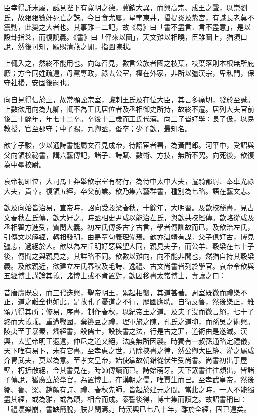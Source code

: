 \begin{pinyinscope}
臣幸得託末屬，誠見陛下有寬明之德，冀銷大異，而興高宗、成王之聲，以崇劉氏，故豤豤數奸死亡之誅。今日食尤屢，星孛東井，攝提炎及紫宮，有識長老莫不震動，此變之大者也。其事難一二記，故《易》曰「書不盡言，言不盡意」，是以設卦指爻，而復說義。《書》曰「伻來以圖」，天文難以相曉，臣雖圖上，猶須口說，然後可知，願賜清燕之閒，指圖陳狀。

上輒入之，然終不能用也。向每召見，數言公族者國之枝葉，枝葉落則本根無所庇廕；方今同姓疏遠，母黨專政，祿去公室，權在外家，非所以彊漢宗，卑私門，保守社稷，安固後嗣也。

向自見得信於上，故常顯訟宗室，譏刺王氏及在位大臣，其言多痛切，發於至誠。上數欲用向為九卿，輒不為王氏居位者及丞相御史所持，故終不遷。居列大夫官前後三十餘年，年七十二卒。卒後十三歲而王氏代漢。向三子皆好學：長子伋，以易教授，官至郡守；中子賜，九卿丞，蚤卒；少子歆，最知名。

歆字子駿，少以通詩書能屬文召見成帝，待詔宦者署，為黃門郎。河平中，受詔與父向領校祕書，講六藝傳記，諸子、詩賦、數術、方技，無所不究。向死後，歆復為中壘校尉。

哀帝初即位，大司馬王莽舉歆宗室有材行，為侍中太中大夫，遷騎都尉、奉車光祿大夫，貴幸。復領五經，卒父前業。歆乃集六藝群書，種別為七略。語在藝文志。

歆及向始皆治易，宣帝時，詔向受穀梁春秋，十餘年，大明習。及歆校秘書，見古文春秋左氏傳，歆大好之。時丞相史尹咸以能治左氏，與歆共校經傳。歆略從咸及丞相翟方進受，質問大義。初左氏傳多古字古言，學者傳訓故而已，及歆治左氏，引傳文以解經，轉相發明，由是章句義理備焉。歆亦湛靖有謀，父子俱好古，博見彊志，過絕於人。歆以為左丘明好惡與聖人同，親見夫子，而公羊、穀梁在七十子後，傳聞之與親見之，其詳略不同。歆數以難向，向不能非間也，然猶自持其穀梁義。及歆親近，欲建立左氏春秋及毛詩、逸禮、古文尚書皆列於學官。哀帝令歆與五經博士講論其義，諸博士或不肯置對，歆因移書太常博士，責讓之曰：

昔唐虞既衰，而三代迭興，聖帝明王，累起相襲，其道甚著。周室既微而禮樂不正，道之難全也如此。是故孔子憂道之不行，歷國應聘。自衛反魯，然後樂正，雅頌乃得其所；修易，序書，制作春秋，以紀帝王之道。及夫子沒而微言絕，七十子終而大義乖。重遭戰國，棄籩豆之禮，理軍旅之陳，孔氏之道抑，而孫吳之術興。陵夷至于暴秦，燔經書，殺儒士，設挾書之法，行是古之罪，道術由是遂滅。漢興，去聖帝明王遐遠，仲尼之道又絕，法度無所因襲。時獨有一叔孫通略定禮儀，天下唯有易卜，未有它書。至孝惠之世，乃除挾書之律，然公卿大臣絳、灌之屬咸介冑武夫，莫以為意。至孝文皇帝，始使掌故朝錯從伏生受尚書。尚書初出于屋壁，朽折散絕，今其書見在，時師傳讀而已。詩始萌牙。天下眾書往往頗出，皆諸子傳說，猶廣立於學官，為置博士。在漢朝之儒，唯賈生而已。至孝武皇帝，然後鄒、魯、梁、趙頗有詩、禮、春秋先師，皆起於建元之間。當此之時，一人不能獨盡其經，或為雅，或為頌，相合而成。泰誓後得，博士集而讀之。故詔書稱曰：「禮壞樂崩，書缺簡脫，朕甚閔焉。」時漢興已七八十年，離於全經，固已遠矣。


\end{pinyinscope}
